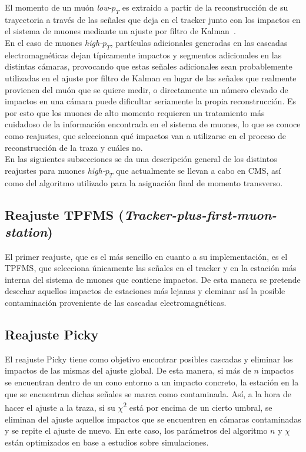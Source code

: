 
El momento de un mu\'on \textit{low-$p_{T}$} es extraido a partir de la reconstrucci\'on de su trayectoria a trav\'es de las se\~nales que deja en el tracker junto con los impactos en el sistema de muones mediante un ajuste por filtro de Kalman~\cite{Kalman1960ANA}. \\

En el caso de muones \textit{high-$p_{T}$}, part\'iculas adicionales generadas en las cascadas electromagn\'eticas dejan t\'ipicamente impactos y segmentos adicionales en las distintas c\'amaras, provocando que estas se\~nales adicionales sean probablemente utilizadas en el ajuste por filtro de Kalman en lugar de las se\~nales que realmente provienen del mu\'on que se quiere medir, o directamente un n\'umero elevado de impactos en una c\'amara puede dificultar seriamente la propia reconstrucci\'on. Es por esto que los muones de alto momento requieren un tratamiento m\'as cuidadoso de la informaci\'on encontrada en el sistema de muones, lo que se conoce como reajustes, que seleccionan qu\'e impactos van a utilizarse en el proceso de reconstrucci\'on de la traza y cu\'ales no. \\

En las siguientes subsecciones se da una descripci\'on general de los distintos reajustes para muones \textit{high-$p_{T}$} que actualmente se llevan a cabo en CMS, as\'i como del algoritmo utilizado para la asignaci\'on final de momento transverso.

\subsection{Reajuste TPFMS (\textit{Tracker-plus-first-muon-station})}\label{sec:TPFMS}

El primer reajuste, que es el m\'as sencillo en cuanto a su implementaci\'on, es el TPFMS, que selecciona \'unicamente las se\~nales en el tracker y en la estaci\'on m\'as interna del sistema de muones que contiene impactos. De esta manera se pretende desechar aquellos impactos de estaciones m\'as lejanas y eleminar as\'i la posible contaminaci\'on proveniente de las cascadas electromagn\'eticas.

\subsection{Reajuste Picky}\label{sec:Picky}

El reajuste Picky tiene como objetivo encontrar posibles cascadas y eliminar los impactos de las mismas del ajuste global. De esta manera, si m\'as de $n$ impactos se encuentran dentro de un cono entorno a un impacto concreto, la estaci\'on en la que se encuentran dichas se\~nales se marca como contaminada. As\'i, a la hora de hacer el ajuste a la traza, si su $\chi$\textsuperscript{2} est\'a por encima de un cierto umbral, se eliminan del ajuste aquellos impactos que se encuentren en c\'amaras contaminadas y se repite el ajuste de nuevo. En este caso, los par\'ametros del algoritmo $n$ y $\chi$ est\'an optimizados en base a estudios sobre simulaciones.

